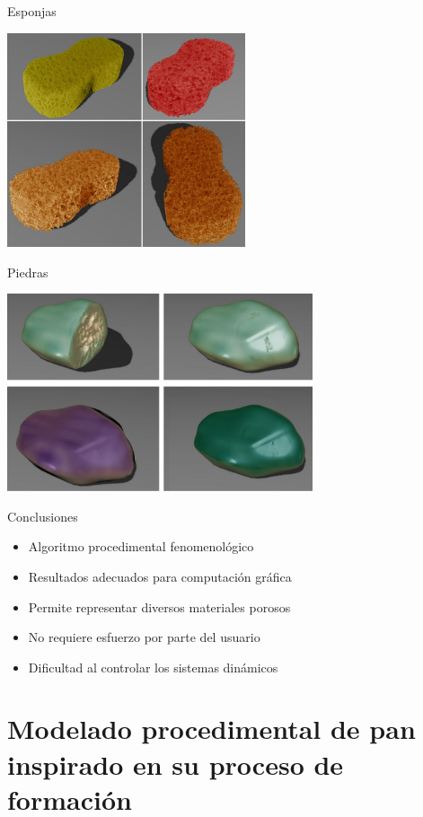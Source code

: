 \documentclass[spanish,unknownkeysallowed]{beamer}
\begin{document}
\begin{frame}{Esponjas}

\centerline{\includegraphics[width=7cm]{../figures/Fig13CAVW}}
\end{frame}

\begin{frame}{Piedras}

\centerline{\includegraphics[width=9cm]{../figures/Fig14CAVW}}
\end{frame}

\begin{frame}{Conclusiones}
\begin{block}{}
\begin{itemize}
\item Algoritmo procedimental fenomenológico
\item Resultados adecuados para computación gráfica
\item Permite representar diversos materiales porosos
\item No requiere esfuerzo por parte del usuario

\item Dificultad al controlar los sistemas dinámicos
\end{itemize}
\end{block}
\end{frame}


\section[Modelado de Pan]{Modelado procedimental de pan inspirado en su proceso de formación}
\end{document}
